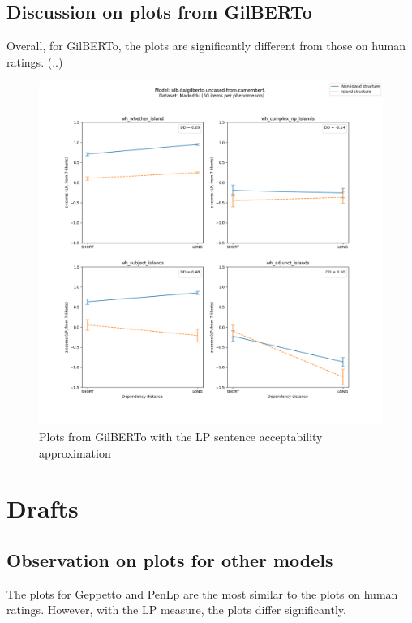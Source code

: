 \subsection{Discussion on plots from GilBERTo}

Overall, for GilBERTo, the plots are significantly different from those on human ratings. (..)

\begin{figure}[H]
	\centering
	\includegraphics[width=1\textwidth]{images/AppendixA/Madeddu_wh_idb-ita_gilberto-uncased-from-camembert_LP-zscores-likert-2022-07-11.png} 
	\caption{Plots from GilBERTo with the LP sentence acceptability approximation}
	\label{fig:gilberto_lp_madeddu}
\end{figure}

\section{Drafts}
\subsection{Observation on plots for other models}


The plots for Geppetto and PenLp are the most similar to the plots on human ratings. However, with the LP measure, the plots differ significantly.

